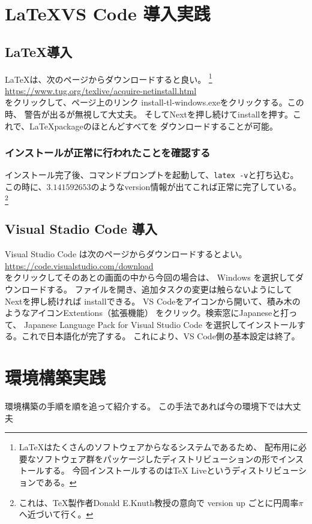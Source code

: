 \documentclass{ltjsarticle}
\begin{document}
\section{\LaTeX VS Code 導入実践}

\subsection{\LaTeX 導入}
\LaTeX は、次のページからダウンロードすると良い。
\footnote{
  \LaTeX はたくさんのソフトウェアからなるシステムであるため、
  配布用に必要なソフトウェア群をパッケージしたディストリビューションの形でインストールする。
  今回インストールするのはTeX Liveというディストリビューションである。
}
\\
\url{https://www.tug.org/texlive/acquire-netinstall.html}\\
をクリックして、ページ上のリンク install-tl-windows.exeをクリックする。この時、
警告が出るが無視して大丈夫。
そしてNextを押し続けてinstallを押す。これで、\LaTeX packageのほとんどすべてを
ダウンロードすることが可能。

\subsubsection*{インストールが正常に行われたことを確認する}
インストール完了後、コマンドプロンプトを起動して、\verb|latex -v|と打ち込む。
この時に、$3.141592653$のようなversion情報が出てこれば正常に完了している。
\footnote{
  これは、\TeX 製作者Donald E.Knuth教授の意向で
  version up ごとに円周率$\pi$へ近づいて行く。
}

\subsection{Visual Stadio Code 導入}
Visual Studio Code は次のページからダウンロードするとよい。\\
\url{https://code.visualstudio.com/download}\\
をクリックしてそのあとの画面の中から今回の場合は、
Windows を選択してダウンロードする。
ファイルを開き、追加タスクの変更は触らないようにしてNextを押し続ければ
installできる。
VS Codeをアイコンから開いて、積み木のようなアイコンExtentions（拡張機能）
をクリック。検索窓にJapaneseと打って、
Japanese Language Pack for Visual Studio Code
を選択してインストールする。これで日本語化が完了する。
これにより、VS Code側の基本設定は終了。
\section{環境構築実践}
環境構築の手順を順を追って紹介する。
この手法であれば今の環境下では大丈夫
\end{document}
